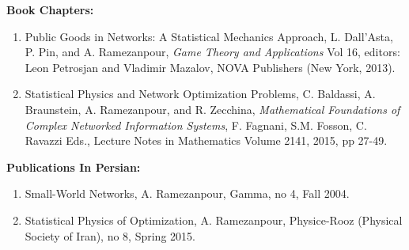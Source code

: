 \documentclass[aps,preprint]{revtex4-1}
\begin{document}
\textbf{Book Chapters:}

\begin{enumerate}

\item  Public Goods in Networks: A Statistical Mechanics Approach, L. Dall'Asta, P. Pin, and A. Ramezanpour, \textit{Game Theory and Applications} Vol 16,
editors: Leon Petrosjan and Vladimir Mazalov, NOVA Publishers (New York, 2013). 

\item Statistical Physics and Network Optimization Problems, C. Baldassi, A. Braunstein, A. Ramezanpour, and R. Zecchina, \textit{Mathematical Foundations of Complex Networked Information Systems}, F. Fagnani, S.M. Fosson, C. Ravazzi Eds., Lecture Notes in Mathematics Volume 2141, 2015, pp 27-49.

\end{enumerate}


\bigskip

\textbf{Publications In Persian:}

\begin{enumerate}

\item Small-World Networks, A. Ramezanpour, Gamma, no 4, Fall 2004.

\item  Statistical Physics of Optimization, A. Ramezanpour, Physice-Rooz (Physical Society of Iran), no 8, Spring 2015.

\end{enumerate}





\end{document}
